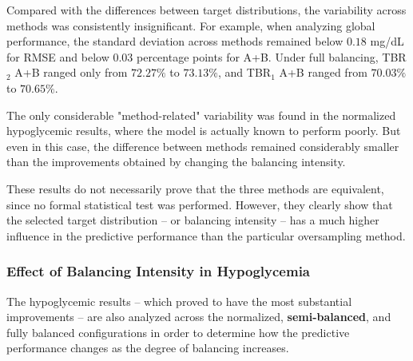Compared with the differences between target distributions, the variability across methods was consistently insignificant. For example, when analyzing global performance, the standard deviation across methods remained below \(0.18\) mg/dL for RMSE and below \(0.03\) percentage points for A+B. Under full balancing, TBR$_2$ A+B ranged only from \(72.27\%\) to \(73.13\%\), and TBR$_1$ A+B ranged from \(70.03\%\) to \(70.65\%\).

The only considerable "method-related" variability was found in the normalized hypoglycemic results, where the model is actually known to perform poorly. But even in this case, the difference between methods remained considerably smaller than the improvements obtained by changing the balancing intensity.

These results do not necessarily prove that the three methods are equivalent, since no formal statistical test was performed. However, they clearly show that the selected target distribution -- or balancing intensity -- has a much higher influence in the predictive performance than the particular oversampling method.

\subsubsection{Effect of Balancing Intensity in Hypoglycemia}
\label{subsubsec:diatrend_hypoglycemia}

The hypoglycemic results -- which proved to have the most substantial improvements -- are also analyzed across the normalized, \textbf{semi-balanced}, and fully balanced configurations in order to determine how the predictive performance changes as the degree of balancing increases.

\begin{table}[htbp]
    \centering
    \caption{DiaTrend performance in the hypoglycemic ranges,
    averaged across balancing methods.}
    \label{tab:diatrend_hypoglycemia}
\end{table}

